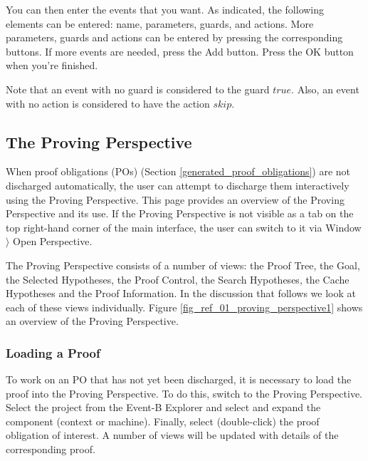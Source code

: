 You can then enter the events that you want. As indicated, the following elements can be entered: name, parameters, guards, and actions. More parameters, guards and actions can be entered by pressing the corresponding buttons. If more events are needed, press the \textsf{Add} button. Press the \textsf{OK} button when you're finished.

Note that an event with no guard is considered to the guard $true$. Also, an event with no action is considered to have the action $skip$. 

\subsection{The Proving Perspective}
\label{proving_perspective}

When proof obligations (POs) (Section \ref{generated_proof_obligations}) are not discharged automatically, the user can attempt to discharge them interactively using the Proving Perspective. This page provides an overview of the Proving Perspective and its use. If the Proving Perspective is not visible as a tab on the top right-hand corner of the main interface, the user can switch to it via \textsf{Window $\rangle$ Open Perspective}.

The Proving Perspective consists of a number of views: the \textsf{Proof Tree}, the \textsf{Goal}, the \textsf{Selected Hypotheses}, the \textsf{Proof Control}, the \textsf{Search Hypotheses}, the \textsf{Cache Hypotheses} and the \textsf{Proof Information}. In the discussion that follows we look at each of these views individually. Figure \ref{fig_ref_01_proving_perspective1} shows an overview of the Proving Perspective.


\subsubsection{Loading a Proof}

To work on an PO that has not yet been discharged, it is necessary to load the proof into the Proving Perspective. To do this, switch to the Proving Perspective. Select the project from the Event-B Explorer and select and expand the component (context or machine). Finally, select (double-click) the proof obligation of interest. A number of views will be updated with details of the corresponding proof. 

